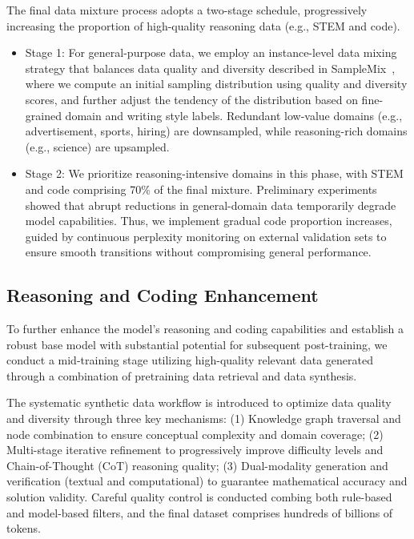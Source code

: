 \documentclass{article}
\begin{document}
The final data mixture process adopts a two-stage schedule, progressively increasing the proportion of high-quality reasoning data (e.g., STEM and code).

\begin{itemize}
    \item Stage 1: For general-purpose data, we employ an instance-level data mixing strategy that balances data quality and diversity described in SampleMix~\citep{samplemix}, where we compute an initial sampling distribution using quality and diversity scores, and further adjust the tendency of the distribution based on fine-grained domain and writing style labels. Redundant low-value domains (e.g., advertisement, sports, hiring) are downsampled, while reasoning-rich domains (e.g., science) are upsampled.

    \item Stage 2:  We prioritize reasoning-intensive domains in this phase, with STEM and code comprising 70\% of the final mixture. Preliminary experiments showed that abrupt reductions in general-domain data temporarily degrade model capabilities. Thus, we implement gradual code proportion increases, guided by continuous perplexity monitoring on external validation sets to ensure smooth transitions without compromising general performance.
\end{itemize}

\subsection{Reasoning and Coding Enhancement}
To further enhance the model's reasoning and coding capabilities and establish a robust base model with substantial potential for subsequent post-training, we conduct a mid-training stage utilizing high-quality relevant data generated through a combination of pretraining data retrieval and data synthesis.

The systematic synthetic data workflow is introduced to optimize data quality and diversity through three key mechanisms: (1) Knowledge graph traversal and node combination to ensure conceptual complexity and domain coverage; (2) Multi-stage iterative refinement to progressively improve difficulty levels and Chain-of-Thought (CoT) reasoning quality; (3) Dual-modality generation and verification (textual and computational) to guarantee mathematical accuracy and solution validity. 
Careful quality control is conducted combing both rule-based and model-based filters, and the final dataset comprises hundreds of billions of tokens.
\end{document}
